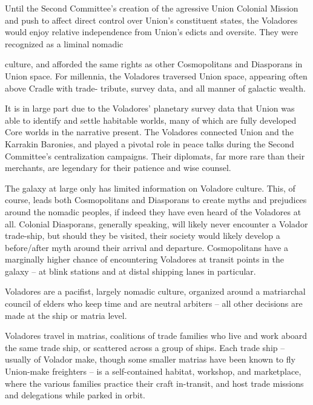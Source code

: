 Until the Second Committee’s creation of the agressive Union Colonial Mission and push to  
affect direct control over Union’s constituent states, the Voladores would enjoy relative  
independence from Union’s edicts and oversite. They were recognized as a liminal nomadic  

                                                                                                                 


culture, and afforded the same rights as other Cosmopolitans and Diasporans in Union space.  
For millennia, the Voladores traversed Union space, appearing often above Cradle with trade- 
tribute, survey data, and all manner of galactic wealth. 
 

It is in large part due to the Voladores’ planetary survey data that Union was able to identify and  
settle habitable worlds, many of which are fully developed Core worlds in the narrative present.  
The Voladores connected Union and the Karrakin Baronies, and played a pivotal role in peace  
talks during the Second Committee’s centralization campaigns. Their diplomats, far more rare  
than their merchants, are legendary for their patience and wise counsel. 
 

The galaxy at large only has limited information on Voladore culture. This, of course, leads both  
Cosmopolitans and Diasporans to create myths and prejudices around the nomadic peoples, if  
indeed they have even heard of the Voladores at all. Colonial Diasporans, generally speaking, will  
likely never encounter a Volador trade-ship, but should they be visited, their society would likely  
develop a before/after myth around their arrival and departure. Cosmopolitans have a marginally  
higher chance of encountering Voladores at transit points in the galaxy -- at blink stations and at  
distal shipping lanes in particular. 
 

Voladores are a pacifist, largely nomadic culture, organized around a matriarchal council of elders  
who keep time and are neutral arbiters -- all other decisions are made at the ship or matria level. 
 

Voladores travel in matrias, coalitions of trade families who live and work aboard the same trade  
ship, or scattered across a group of ships. Each trade ship -- usually of Volador make, though  
some smaller matrias have been known to fly Union-make freighters -- is a self-contained  
habitat, workshop, and marketplace, where the various families practice their craft in-transit, and  
host trade missions and delegations while parked in orbit.
 

